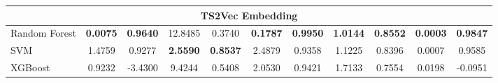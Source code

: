 \begin{table}
\begin{tabular}{lcccccccccc}
\multicolumn{11}{c}{\textbf{TS2Vec Embedding}}                                                                                                                                                                                                                                                                                                      \\ \hline
Random Forest                                                                                                         & \textbf{0.0075}                      & \textbf{0.9640}      & 12.8485                     & 0.3740      & \textbf{0.1787}                      & \textbf{0.9950}      & \textbf{1.0144}                       & \textbf{0.8552}       & \textbf{0.0003}                      & \textbf{0.9847}      \\
SVM                                                                                                                   & 1.4759                      & 0.9277      & \textbf{2.5590}                      & \textbf{0.8537}      & 2.4879                      & 0.9358      & 1.1225                       & 0.8396       & 0.0007                      & 0.9585      \\
XGBoost                                                                                                               & 0.9232                      & -3.4300     & 9.4244                      & 0.5408      & 2.0530                      & 0.9421      & 1.7133                       & 0.7554       & 0.0198                      & -0.0951     \\ \hline
\end{tabular}
\end{table}

